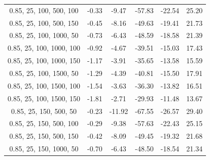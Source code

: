 \documentclass{article}
\begin{document}
\begin{table}[H]
{\begin{tabular}{|c|c|c|c|c|c|}
                0.85, 25, 100, 500, 100    & -0.33                      & -9.47                      & -57.83                     & -22.54                   & 25.20                   \\
                0.85, 25, 100, 500, 150    & -0.45                      & -8.16                      & -49.63                     & -19.41                   & 21.73                   \\
                0.85, 25, 100, 1000, 50    & -0.73                      & -6.43                      & -48.59                     & -18.58                   & 21.39                   \\
                0.85, 25, 100, 1000, 100   & -0.92                      & -4.67                      & -39.51                     & -15.03                   & 17.43                   \\
                0.85, 25, 100, 1000, 150   & -1.17                      & -3.91                      & -35.65                     & -13.58                   & 15.59                   \\
                0.85, 25, 100, 1500, 50    & -1.29                      & -4.39                      & -40.81                     & -15.50                   & 17.91                   \\
                0.85, 25, 100, 1500, 100   & -1.54                      & -3.63                      & -36.30                     & -13.82                   & 16.51                   \\
                0.85, 25, 100, 1500, 150   & -1.81                      & -2.71                      & -29.93                     & -11.48                   & 13.67                   \\
                0.85, 25, 150, 500, 50     & -0.23                      & -11.92                     & -67.55                     & -26.57                   & 29.40                   \\
                0.85, 25, 150, 500, 100    & -0.29                      & -9.38                      & -57.63                     & -22.43                   & 25.15                   \\
                0.85, 25, 150, 500, 150    & -0.42                      & -8.09                      & -49.45                     & -19.32                   & 21.68                   \\
                0.85, 25, 150, 1000, 50    & -0.70                      & -6.43                      & -48.50                     & -18.54                   & 21.34                   \\

\end{tabular}}
\end{table}
\end{document}
